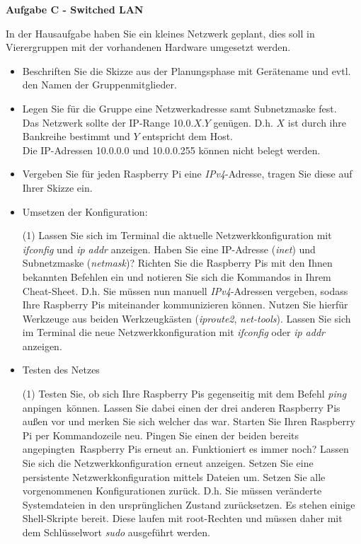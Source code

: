 \documentclass[paper=a4,fontsize=11pt]{scrartcl}%
\numberwithin{equation}{section}
\begin{document}
\begin{center}\Large{\textbf{Aufgabe C - Switched LAN}}\end{center}\vskip0.25in
In der Hausaufgabe haben Sie ein kleines Netzwerk geplant, dies soll in Vierergruppen mit der vorhandenen Hardware umgesetzt werden.
\begin{itemize}
	\item[1.)] Beschriften Sie die Skizze aus der Planungsphase mit Gerätename und evtl. den Namen der Gruppenmitglieder.
	\item[2.)] Legen Sie für die Gruppe eine Netzwerkadresse samt Subnetzmaske fest.\\
	Das Netzwerk sollte der IP-Range 10.0.$X.Y$ genügen. D.h. $X$ ist durch ihre Bankreihe bestimmt und $Y$ entspricht dem Host.\\
	Die IP-Adressen 10.0.0.0 und 10.0.0.255 können nicht belegt werden.
	\item[3.)] Vergeben Sie für jeden Raspberry Pi eine \emph{IPv4}-Adresse, tragen Sie diese auf Ihrer Skizze ein.
	\item[4.)] Umsetzen der Konfiguration:
\begin{tasks}(1)
	\task Lassen Sie sich im Terminal die aktuelle Netzwerkkonfiguration mit \emph{ifconfig} und \emph{ip addr} anzeigen. Haben Sie eine IP-Adresse (\emph{inet}) und Subnetzmaske (\emph{netmask})?
	\task Richten Sie die Raspberry Pis mit den Ihnen bekannten Befehlen ein und notieren Sie sich die Kommandos in Ihrem Cheat-Sheet. D.h. Sie müssen nun manuell \emph{IPv4}-Adressen vergeben, sodass Ihre Raspberry Pis miteinander kommunizieren können. Nutzen Sie hierfür Werkzeuge aus beiden Werkzeugkästen (\emph{iproute2}, \emph{net-tools}).
	\task Lassen Sie sich im Terminal die neue Netzwerkkonfiguration mit \emph{ifconfig} oder \emph{ip addr} anzeigen.
\end{tasks}
\item[4.)] Testen des Netzes
\begin{tasks}(1)
	\task Testen Sie, ob sich Ihre Raspberry Pis gegenseitig mit dem Befehl \emph{ping} \glqq anpingen\grqq\ können. Lassen Sie dabei einen der drei anderen Raspberry Pis außen vor und merken Sie sich welcher das war.
	\task Starten Sie Ihren Raspberry Pi per Kommandozeile neu. Pingen Sie einen der beiden bereits \glqq angepingten\grqq\ Raspberry Pis erneut an. Funktioniert es immer noch?
	\task Lassen Sie sich die Netzwerkkonfiguration erneut anzeigen.
	\task Setzen Sie eine persistente Netzwerkkonfiguration mittels Dateien um.
	\task Setzen Sie alle vorgenommenen Konfigurationen zurück. D.h. Sie müssen veränderte Systemdateien in den ursprünglichen Zustand zurücksetzen. Es stehen einige Shell-Skripte bereit. Diese laufen mit root-Rechten und müssen daher mit dem Schlüsselwort \emph{sudo} ausgeführt werden.

\end{tasks}
\end{itemize}
\end{document}
